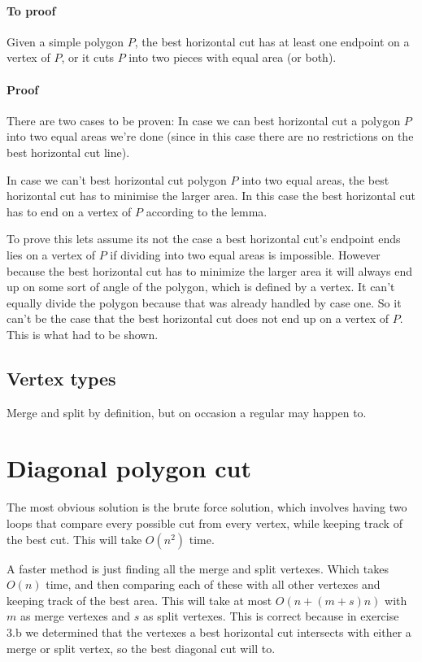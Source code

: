 \documentclass{article}
\begin{document}
\paragraph{To proof} Given a simple polygon $P$, the best horizontal cut
has at least one endpoint on a vertex of $P$, or it cuts $P$ into two pieces
with equal area (or both).

\paragraph{Proof} There are two cases to be proven:
	In case we can best horizontal cut a polygon $P$ into two equal areas
	we're done (since in this case there are no restrictions on the best
	horizontal cut line).

	In case we can't best horizontal cut polygon $P$ into two equal areas,
	the best horizontal cut has to minimise the larger area. In this case
	the best horizontal cut has to end on a vertex of $P$ according to
	the lemma.

	To prove this lets assume its not the case a best horizontal cut's endpoint
	ends lies on a vertex of $P$ if dividing into two equal areas is impossible.
	However because the best horizontal cut has to minimize the larger
	area it will always end up on some sort of angle of the polygon, which
	is defined by a vertex. It can't equally divide the polygon because
	that was already handled by case one.
	So it can't be the case that the best horizontal cut does not
	end up on a vertex of $P$. This is what had to be shown.

\subsection{Vertex types}
Merge and split by definition, but on occasion a regular may happen to.
\section{Diagonal polygon cut}
The most obvious solution is the brute force solution, which involves
having two loops that compare every possible cut from every vertex,
while keeping track of the best cut. This will take $O(n^2)$ time.

A faster method is just finding all the merge and split vertexes. Which takes
$O(n)$ time, and then comparing each of these with all other vertexes and keeping
track of the best area. This will take at most $O(n+(m+s)n)$
with $m$ as merge vertexes and $s$ as split vertexes. This is correct because in
exercise 3.b we determined that the vertexes a best horizontal cut intersects
with either a merge or split vertex, so the best diagonal cut will to.
\end{document}

